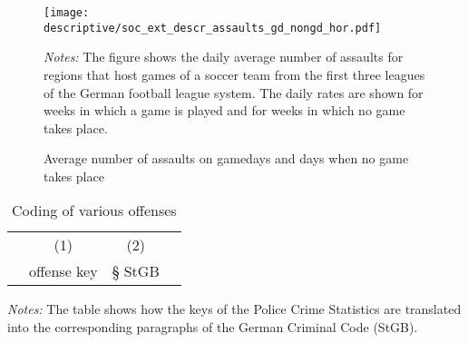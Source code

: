 \documentclass[11pt, a4paper]{article} %
\begin{document}
\vspace*{\fill}\clearpage
\vspace*{\fill}
\begin{figure}[H]\centering
	\caption{Average number of assaults on gamedays and days when no game takes place}\label{fig_soc_ext:assaults_across_dows}
	\texttt{[image: descriptive/soc\_ext\_descr\_assaults\_gd\_nongd\_hor.pdf]}
	\scriptsize
	\begin{minipage}{\linewidth}
		\emph{Notes:} The figure shows the daily average number of assaults for regions that host games of a soccer team from the first three leagues of the German football league system. The daily rates are shown for weeks in which a game is played and for weeks in which no game takes place.
	\end{minipage}
\end{figure}
\vspace*{\fill}\clearpage


\newpage
\renewcommand\thetable{A\arabic{table}}
\setcounter{table}{0} 



\vspace*{\fill}
\begin{table}[H]\centering
	\begin{threeparttable}\centering \caption{Coding of various offenses}\label{tab_soc_ext:offense_keys_code}
		\begin{tabular}{lccc}
			\toprule
			&\multicolumn{1}{c}{(1)}&\multicolumn{1}{c}{(2)}\\
			& offense key & § StGB \\
			\midrule
			
			\bottomrule
		\end{tabular}
		\begin{tablenotes}
			\item \scriptsize \emph{Notes:} The table shows how the keys of the Police Crime Statistics are translated into the corresponding paragraphs of the German Criminal Code (StGB).
		\end{tablenotes}
	\end{threeparttable}
\end{table}
\vspace*{\fill}\clearpage
\end{document}
